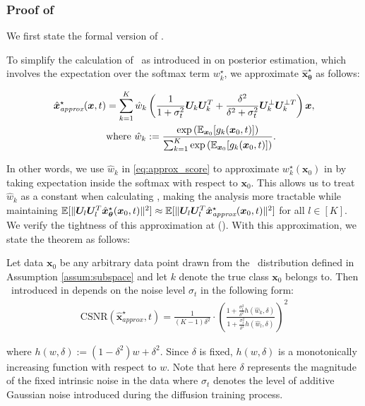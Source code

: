 \subsubsection{Proof of }\label{app:thm1_proof}
We first state the formal version of .

To simplify the calculation of \CSNR~as introduced in  on posterior estimation, which involves the expectation over the softmax term $w^{\star}_k$, we approximate $\hat{\bm x}_{\bm \theta}^{\star}$ as follows: 

\begin{align}\label{eq:approx_score}
    \begin{split}
    \hat{\bm x}_{\textit{approx}}^{\star}(\bm x, t) &= \sum_{k=1}^K \hat{w}_k \left( \frac{1}{1 + \sigma_t^2} \bm U_k\bm U_k^T + \frac{\delta^2}{\delta^2 + \sigma_t^2} \bm U_k^{\perp}\bm U_k^{\perp T} \right) \bm x , \\
    &\text{where}\ \hat{w}_k := \frac{\exp\left( \operatorname{\mathbb{E}}_{\bm x_0} [g_k(\bm x_0, t)] \right)}{\sum_{k=1}^K \exp\left( \operatorname{\mathbb{E}}_{\bm x_0} [g_k(\bm x_0, t)] \right)}.
    \end{split}
\end{align}

In other words, we use $\hat{w}_k$ in \eqref{eq:approx_score} to approximate $w^{\star}_k(\bm x_0)$
in  by taking expectation inside the softmax with respect to $\bm x_0$. This allows us to treat $\hat{w}_k$ as a constant when calculating \CSNR, making the analysis more tractable while maintaining $\operatorname{\mathbb{E}}[\|\bm U_l\bm U_l^T\hat{\bm x}_{\bm \theta}^{\star}(\bm x_0, t)\|^2] \approx \operatorname{\mathbb{E}}[\|\bm U_l\bm U_l^T \hat{\bm x}_{\textit{approx}}^{\star}(\bm x_0, t)\|^2]$ for all $l \in [K]$. We verify the tightness of this approximation at  (). With this approximation, we state the theorem as follows:

\begin{theorem}\label{lem:main_formal}
Let data $\bm x_0$ be any arbitrary data point drawn from the \MoLRG~distribution defined in Assumption \ref{assum:subspace} and let $k$ denote the true class $\bm x_0$ belongs to. Then \CSNR~introduced in  depends on the noise level $\sigma_t$ in the following form: 
    \begin{align}\label{eq:csnr_2}
        \mathrm{CSNR}(\hat{\bm x}_{\textit{approx}}^{\star},t) = \frac{1}{(K-1)\delta^2} \cdot\left(\frac{1 + \frac{\sigma_t^2}{\delta^2}h(\hat{w}_k, \delta)}{1 + \frac{\sigma_t^2}{\delta^2}h(\hat{w}_l, \delta)}\right)^2
    \end{align}
    
where $h(w, \delta) := (1 - \delta^2)w + \delta^2$. Since $\delta$ is fixed, $h(w,\delta)$ is a monotonically increasing function with respect to $w$. Note that here $\delta$ represents the magnitude of the fixed intrinsic noise in the data where $\sigma_t$ denotes the level of additive Gaussian noise introduced during the diffusion training process.

\end{theorem}

